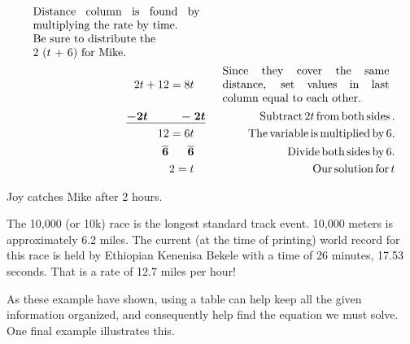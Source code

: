 \begin{example}
\begin{eqnarray*}
\begin{array}{p{0.425\textwidth}}
      \tmop{Distance} \tmop{column} \tmop{is} \tmop{found} \tmop{by}
      \tmop{multiplying} \tmop{the} \tmop{rate} \tmop{by} \tmop{time}.\\
			\tmop{Be} \tmop{sure} \tmop{to} \tmop{distribute} \tmop{the}\\
			2 ($t~+$ 6) \tmop{for} \tmop{Mike}.\\
    \end{array}\\
    2 t + 12 = 8 t~~~ &  &  \begin{array}{p{0.425\textwidth}}
		\tmop{Since} \tmop{they} \tmop{cover} \tmop{the} \tmop{same} \tmop{distance}, \tmop{set} \tmop{values} \tmop{in} \tmop{last} \tmop{column} \tmop{equal} \tmop{to} \tmop{each} \tmop{other}.
		\end{array}\\
    \tmmathbf{\underline{- 2 t ~~~~~~~~- 2 t}} &  & \tmop{~Subtract} 2 t \tmop{from}
    \tmop{both} \tmop{sides}.\\
    12 = 6 t~~~ &  & \tmop{~The} \tmop{variable} \tmop{is} \tmop{multiplied}
    \tmop{by} 6.\\
    \tmmathbf{\overline{6} ~~~~~ \overline{6}}~~~ &  & \tmop{~Divide} \tmop{both}
    \tmop{sides} \tmop{by} 6.\\
    2 = t~~~ &  & \tmop{~Our} \tmop{solution} \tmop{for} t
  \end{eqnarray*}
\begin{center}
Joy catches Mike after 2 hours.
\end{center}
\end{example}


 {} The 10,000 (or 10k) race is the longest standard track
event. 10,000 meters is approximately 6.2 miles. The current (at the time of
printing) world record for this race is held by Ethiopian Kenenisa Bekele with
a time of 26 minutes, 17.53 seconds. That is a rate of 12.7 miles per hour!\pp

 As these example have shown, using a table can help keep all the given
information organized, and consequently help find the equation we
must solve. One final example illustrates this.

\pagebreak

